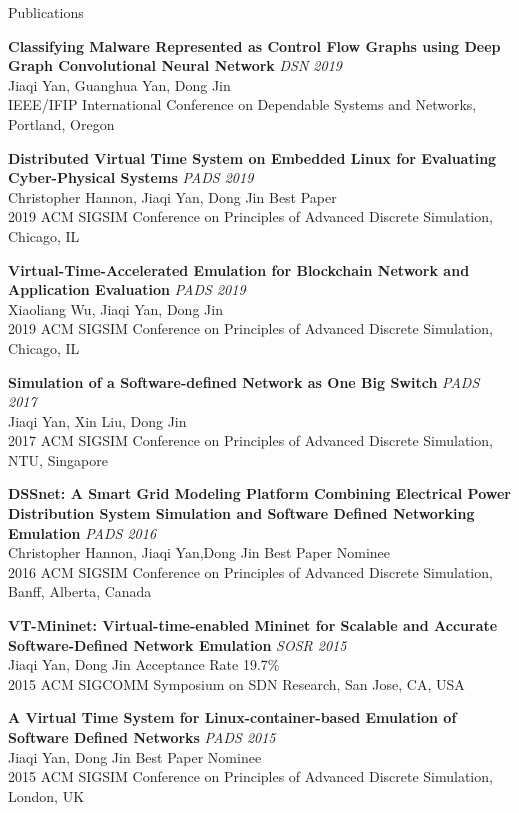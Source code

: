 \documentclass{resume} %
\begin{document}

\begin{rSection}{Publications}

{\bf Classifying Malware Represented as Control Flow Graphs using Deep Graph Convolutional Neural Network} \hfill {\em DSN 2019} \\
Jiaqi Yan, Guanghua Yan, Dong Jin \\
IEEE/IFIP International Conference on Dependable Systems and Networks, Portland, Oregon

{\bf Distributed Virtual Time System on Embedded Linux for Evaluating Cyber-Physical Systems} \hfill {\em PADS 2019}\\ 
Christopher Hannon, Jiaqi Yan, Dong Jin \hfill {\color{red}Best Paper} \\
2019 ACM SIGSIM Conference on Principles of Advanced Discrete Simulation, Chicago, IL

{\bf Virtual-Time-Accelerated Emulation for Blockchain Network and Application Evaluation} \hfill {\em PADS 2019}\\ 
Xiaoliang Wu, Jiaqi Yan, Dong Jin \\
2019 ACM SIGSIM Conference on Principles of Advanced Discrete Simulation, Chicago, IL

{\bf Simulation of a Software-defined Network as One Big Switch} \hfill {\em PADS 2017}\\ 
Jiaqi Yan, Xin Liu, Dong Jin \\
2017 ACM SIGSIM Conference on Principles of Advanced Discrete Simulation, NTU, Singapore

{\bf DSSnet: A Smart Grid Modeling Platform Combining Electrical Power Distribution System
    Simulation and Software Defined Networking Emulation} \hfill {\em PADS 2016}\\ 
Christopher Hannon, Jiaqi Yan,Dong Jin \hfill {\color{red}Best Paper Nominee} \\
2016 ACM SIGSIM Conference on Principles of Advanced Discrete Simulation, Banff, Alberta, Canada

{\bf VT-Mininet: Virtual-time-enabled Mininet for Scalable and Accurate Software-Defined Network Emulation} \hfill {\em SOSR 2015}\\ 
Jiaqi Yan, Dong Jin \hfill {\color{red}Acceptance Rate 19.7\%} \\
2015 ACM SIGCOMM Symposium on SDN Research, San Jose, CA, USA

{\bf A Virtual Time System for Linux-container-based Emulation of Software Defined Networks} \hfill {\em PADS 2015}\\
Jiaqi Yan, Dong Jin \hfill {\color{red}Best Paper Nominee} \\
2015 ACM SIGSIM Conference on Principles of Advanced Discrete Simulation, London, UK

\end{rSection}
\end{document}
